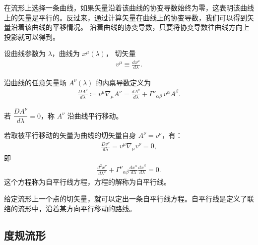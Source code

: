 在流形上选择一条曲线，如果矢量沿着该曲线的协变导数始终为零，这表明该曲线上的矢量是平行的。反过来，通过计算矢量在曲线上的协变导数，我们可以得到矢量沿着该曲线的平移情况。
沿着曲线的协变导数，只要将协变导数往曲线方向上投影就可以得到。
\begin{definition}[内禀导数]
  设曲线参数为 $\lambda$，曲线为 $x^{\mu}(\lambda)$，
切矢量
\begin{align}
v^{\mu} \equiv \frac{dx^{\mu}}{d\lambda}.
\end{align}

沿曲线的任意矢量场 $A^{\nu}(\lambda)$ 的内禀导数定义为
\begin{align}
\frac{D A^{\nu}}{d\lambda}
\coloneqq v^{\mu} \nabla_{\mu} A^{\nu}
= \frac{dA^{\nu}}{d\lambda}
+ \Gamma^{\nu}{}_{\alpha\beta}\,v^{\alpha} A^{\beta}.
\end{align}
\end{definition}
\begin{definition}[平行移动]
  若 $\dfrac{D A^{\nu}}{d\lambda}=0$，称 $A^{\nu}$ 沿曲线平行移动。
\end{definition}

\begin{definition}[自平行线]
  若取被平行移动的矢量为曲线的切矢量自身 $A^{\nu}=v^{\nu}$，有：
\begin{align}
\frac{D v^{\nu}}{d\lambda} 
= v^{\mu} \nabla_{\mu} v^{\nu} = 0,
\end{align}
即
\begin{align}\label{eq:self_para}
\frac{d^2 x^{\nu}}{d\lambda^2}
+ \Gamma^{\nu}{}_{\alpha\beta}
\frac{dx^{\alpha}}{d\lambda}\frac{dx^{\beta}}{d\lambda} = 0.
\end{align}
这个方程称为自平行线方程，方程的解称为自平行线。
\end{definition}
给定流形上一个点的切矢量，就可以定出一条自平行线方程。自平行线是定义了联络的流形中，沿着某方向平行移动的路线。


\subsection{度规流形}
